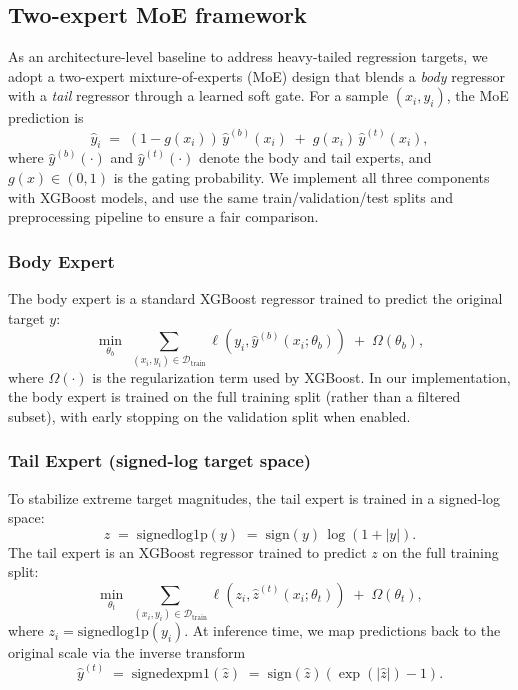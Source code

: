 \documentclass[pdflatex,sn-basic,Numbered]{sn-jnl}
\begin{document}
\subsection{Two-expert MoE framework}
As an architecture-level baseline to address heavy-tailed regression targets, we adopt a two-expert mixture-of-experts (MoE) design that blends a \emph{body} regressor with a \emph{tail} regressor through a learned soft gate. For a sample $(x_i,y_i)$, the MoE prediction is
\begin{equation}
    \hat{y}_i \;=\; (1-g(x_i))\,\hat{y}^{(b)}(x_i) \;+\; g(x_i)\,\hat{y}^{(t)}(x_i),
\end{equation}
where $\hat{y}^{(b)}(\cdot)$ and $\hat{y}^{(t)}(\cdot)$ denote the body and tail experts, and $g(x)\in(0,1)$ is the gating probability. We implement all three components with XGBoost models, and use the same train/validation/test splits and preprocessing pipeline to ensure a fair comparison.

\subsubsection{Body Expert}
The body expert is a standard XGBoost regressor trained to predict the original target $y$:
\begin{equation}
    \min_{\theta_b}\;\sum_{(x_i,y_i)\in\mathcal{D}_{\mathrm{train}}} 
    \ell\!\left(y_i,\hat{y}^{(b)}(x_i;\theta_b)\right) \;+\; \Omega(\theta_b),
\end{equation}
where $\Omega(\cdot)$ is the regularization term used by XGBoost. In our implementation, the body expert is trained on the full training split (rather than a filtered subset), with early stopping on the validation split when enabled.

\subsubsection{Tail Expert (signed-log target space)}
To stabilize extreme target magnitudes, the tail expert is trained in a signed-log space:
\begin{equation}
    z \;=\; \mathrm{signedlog1p}(y) \;=\; \mathrm{sign}(y)\,\log(1+|y|).
\end{equation}
The tail expert is an XGBoost regressor trained to predict $z$ on the full training split:
\begin{equation}
    \min_{\theta_t}\;\sum_{(x_i,y_i)\in\mathcal{D}_{\mathrm{train}}} 
    \ell\!\left(z_i,\hat{z}^{(t)}(x_i;\theta_t)\right) \;+\; \Omega(\theta_t),
\end{equation}
where $z_i=\mathrm{signedlog1p}(y_i)$. At inference time, we map predictions back to the original scale via the inverse transform
\begin{equation}
    \hat{y}^{(t)} \;=\; \mathrm{signedexpm1}(\hat{z}) \;=\; \mathrm{sign}(\hat{z})\left(\exp(|\hat{z}|)-1\right).
\end{equation}
\end{document}
